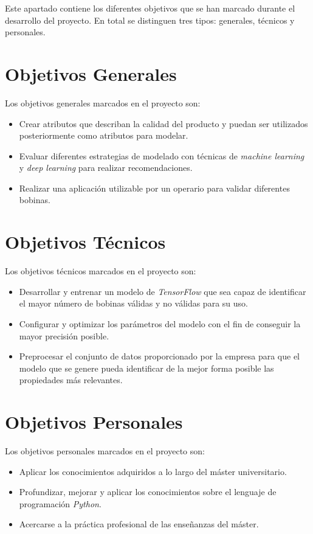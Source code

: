 
Este apartado contiene los diferentes objetivos que se han marcado durante el desarrollo del proyecto. En total se distinguen tres tipos: generales, técnicos y personales. 

\section{Objetivos Generales}
Los objetivos generales marcados en el proyecto son:
\begin{itemize}
    \item Crear atributos que describan la calidad del producto y puedan ser utilizados posteriormente como atributos para modelar.
    \item Evaluar diferentes estrategias de modelado con técnicas de \emph{machine learning} y \emph{deep learning} para realizar recomendaciones.
    \item Realizar una aplicación utilizable por un operario para validar diferentes bobinas.
\end{itemize}

\section{Objetivos Técnicos}
Los objetivos técnicos marcados en el proyecto son:
\begin{itemize}
    \item Desarrollar y entrenar un modelo de \emph{TensorFlow} que sea capaz de identificar el mayor número de bobinas válidas y no válidas para su uso.
    \item Configurar y optimizar los parámetros del modelo con el fin de conseguir la mayor precisión posible.
    \item Preprocesar el conjunto de datos proporcionado por la empresa para que el modelo que se genere pueda identificar de la mejor forma posible las propiedades más relevantes.
\end{itemize}

\section{Objetivos Personales}
Los objetivos personales marcados en el proyecto son:
\begin{itemize}
    \item Aplicar los conocimientos adquiridos a lo largo del máster universitario.
    \item Profundizar, mejorar y aplicar los conocimientos sobre el lenguaje de programación \emph{Python}.
    \item Acercarse a la práctica profesional de las enseñanzas del máster.
\end{itemize}